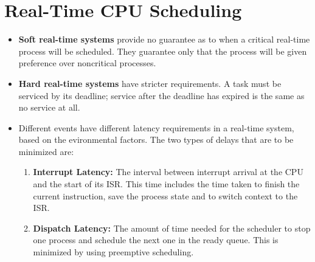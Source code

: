 \documentclass{article}
\theoremstyle{plain}
\theoremstyle{definition}
\begin{document}
\section{Real-Time CPU Scheduling}
\begin{itemize}

    \item \textbf{Soft real-time systems} provide no guarantee as to when a critical real-time process will be scheduled. They guarantee only that the process will be given preference over noncritical processes. 
    
    \item \textbf{Hard real-time systems} have stricter requirements. A task must be serviced by its deadline; service after the deadline has expired is the same as no service at all.
    
    \item Different events have different latency requirements in a real-time system, based on the evironmental factors. The two types of delays that are to be minimized are:
    \begin{enumerate}
        \item \textbf{Interrupt Latency:} The interval between interrupt arrival at the CPU and the start of its ISR. This time includes the time taken to finish the current instruction, save the process state and to switch context to the ISR.
        
        \item \textbf{Dispatch Latency:} The amount of time needed for the scheduler to stop one process and schedule the next one in the ready queue. This is minimized by using preemptive scheduling. 
    \end{enumerate}
\end{itemize}
\end{document}
